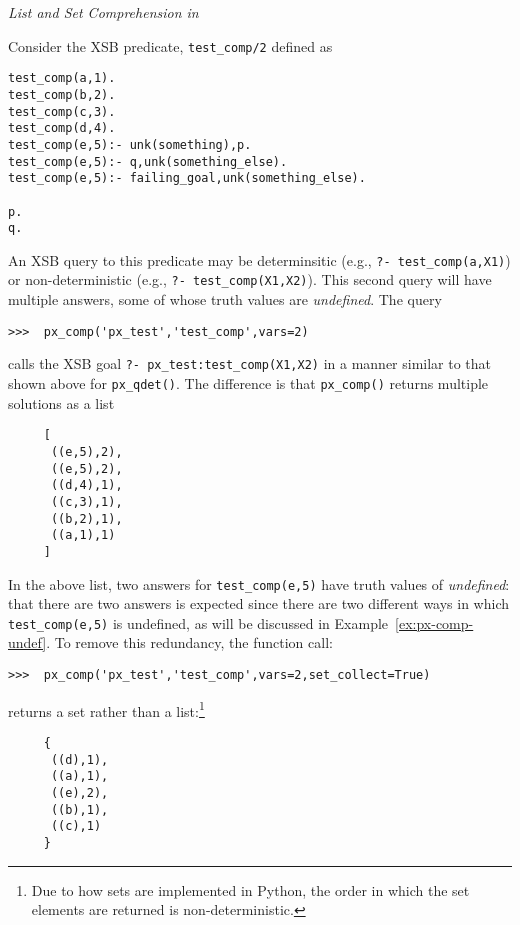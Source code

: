 \begin{example} \rm {\it List and Set Comprehension in \px{}} \label{ex:list-comp-1}

  Consider the XSB predicate, {\tt test\_comp/2} defined as

{\small  
\begin{verbatim}  
test_comp(a,1).
test_comp(b,2).
test_comp(c,3).
test_comp(d,4).
test_comp(e,5):- unk(something),p.
test_comp(e,5):- q,unk(something_else).
test_comp(e,5):- failing_goal,unk(something_else).

p.
q.
\end{verbatim}
}

\noindent
An XSB query to this predicate may be determinsitic (e.g., {\tt ?-
  test\_comp(a,X1)}) or non-deterministic (e.g., {\tt ?-
  test\_comp(X1,X2)}).  This second query will have multiple answers,
some of whose truth values are {\em undefined}.  The \px{} query

\begin{verbatim}
>>>  px_comp('px_test','test_comp',vars=2)
\end{verbatim}

\noindent
calls the XSB goal {\tt ?- px\_test:test\_comp(X1,X2)} in a manner
similar to that shown above for {\tt px\_qdet()}.  The difference is
that {\tt px\_comp()} returns multiple solutions as a list

{\small  
\begin{verbatim}
     [
      ((e,5),2),
      ((e,5),2),
      ((d,4),1),
      ((c,3),1),
      ((b,2),1),
      ((a,1),1) 
     ]
\end{verbatim}
}

\noindent
In the above list, two answers for {\tt test\_comp(e,5)} have truth
values of {\em undefined}: that there are two answers is expected
since there are two different ways in which {\tt test\_comp(e,5)} is
undefined, as will be discussed in Example~\ref{ex:px-comp-undef}.  To
remove this redundancy, the function call:

\begin{verbatim}
>>>  px_comp('px_test','test_comp',vars=2,set_collect=True)
\end{verbatim}

\noindent
returns a set rather than a list:\footnote{Due to how sets are
  implemented in Python, the order in which the set elements are
  returned is non-deterministic.}

{\small  
\begin{verbatim}
     {
      ((d),1),
      ((a),1),
      ((e),2),
      ((b),1),
      ((c),1) 
     }
\end{verbatim}
}


\end{example}
